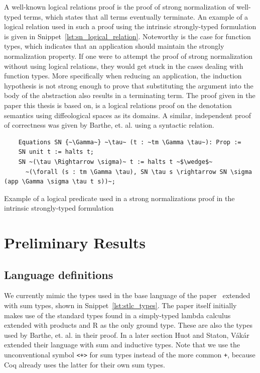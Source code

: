 \documentclass[11pt, final]{article}
\def\Vakar{V\'{a}k\'{a}r}
\begin{document}
A well-known logical relations proof is the proof of strong normalization of well-typed terms, which states that all terms eventually terminate.
An example of a logical relation used in such a proof using the intrinsic strongly-typed formulation is given in Snippet~\ref{lst:sn_logical_relation}.
Noteworthy is the case for function types, which indicates that an application should maintain the strongly normalization property.
If one were to attempt the proof of strong normalization without using logical relations, they would get stuck in the cases dealing with function types.
More specifically when reducing an application, the induction hypothesis is not strong enough to prove that substituting the argument into the body of the abstraction also results in a terminating term.
The proof given in the paper this thesis is based on, is a logical relations proof on the denotation semantics using diffeological spaces as its domains\cite{huot2020correctness}.
A similar, independent proof of correctness was given by Barthe, et. al.\cite{barthe2020versatility} using a syntactic relation.

\begin{listing}
  \begin{verbatim}
    Equations SN {~\Gamma~} ~\tau~ (t : ~tm \Gamma \tau~): Prop :=
    SN unit t := halts t;
    SN ~(\tau \Rightarrow \sigma)~ t := halts t ~$\wedge$~
      ~(\forall (s : tm \Gamma \tau), SN \tau s \rightarrow SN \sigma (app \Gamma \sigma \tau t s))~;
  \end{verbatim}
  \caption{Example of a logical predicate used in a strong normalizations proof in the intrinsic strongly-typed formulation}
  \label{lst:sn_logical_relation}
\end{listing}

\section{Preliminary Results}

\subsection{Language definitions}

We currently mimic the types used in the base language of the paper~\cite{huot2020correctness} extended with sum types, shown in Snippet~\ref{lst:stlc_types}.
The paper itself initially makes use of the standard types found in a simply-typed lambda calculus extended with products and R as the only ground type.
These are also the types used by Barthe, et. al.\cite{barthe2020versatility} in their proof. In a later section Huot and Staton, \Vakar{} extended their language with sum and inductive types.
Note that we use the unconventional symbol \texttt{<+>} for sum types instead of the more common \texttt{+}, because Coq already uses the latter for their own sum types.
\end{document}
